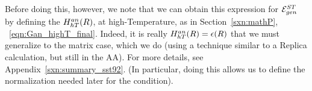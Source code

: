 Before doing this, however, we note that 
we can obtain this expression for ${\mathcal{E}}^{ST}_{gen}$ by defining the
\AnnealedHamiltonian $H^{an}_{hT}(R)$, at high-Temperature, as in Section~\ref{sxn:mathP}, \EQN~\ref{eqn:Gan_highT_final}.
Indeed, it is really $H^{an}_{hT}(R)=\epsilon(R)$ that we must generalize to the matrix case, which we do (using a technique
similar to a Replica calculation, but still in the AA).
For more details, see Appendix~\ref{sxn:summary_sst92}.
(In particular, doing this allows us to define the normalization needed later for the \TRACELOG condition).


